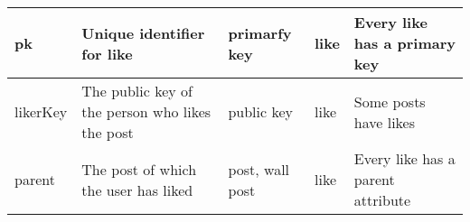 \begin{center}
\begin{tabular}{| l | l | l | l | l |}
    pk       & Unique identifier for like                      & primarfy key     & like & Every like has a primary key \\ \hline
    likerKey & The public key of the person who likes the post & public key      & like & Some posts have likes \\ \hline
    parent   & The post of which the user has liked            & post, wall post & like & Every like has a parent attribute \\ \hline
    \hline 
    \end{tabular}
\end{center}


